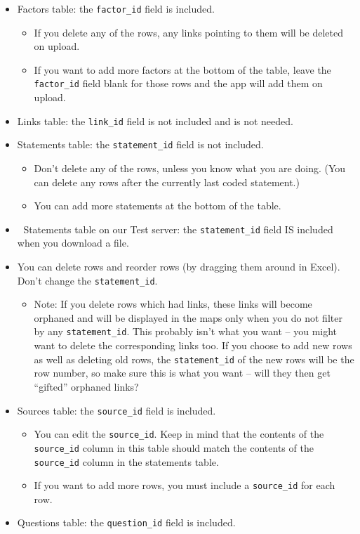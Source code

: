 \documentclass[
]{book}
\providecommand{\tightlist}{%
  \setlength{\itemsep}{0pt}\setlength{\parskip}{0pt}}
\begin{document}
\begin{itemize}
\tightlist
\item
  Factors table: the \texttt{factor\_id} field is included.

  \begin{itemize}
  \tightlist
  \item
    If you delete any of the rows, any links pointing to them will be deleted on upload.
  \item
    If you want to add more factors at the bottom of the table, leave the \texttt{factor\_id} field blank for those rows and the app will add them on upload.
  \end{itemize}
\item
  Links table: the \texttt{link\_id} field is not included and is not needed.
\item
  Statements table: the \texttt{statement\_id} field is not included.

  \begin{itemize}
  \tightlist
  \item
    Don't delete any of the rows, unless you know what you are doing. (You can delete any rows after the currently last coded statement.)
  \item
    You can add more statements at the bottom of the table.
  \end{itemize}
\item
  🧪 Statements table on our Test server: the \texttt{statement\_id} field IS included when you download a file.
\item
  You can delete rows and reorder rows (by dragging them around in Excel). Don't change the \texttt{statement\_id}.

  \begin{itemize}
  \tightlist
  \item
    Note: If you delete rows which had links, these links will become orphaned and will be displayed in the maps only when you do not filter by any \texttt{statement\_id}. This probably isn't what you want -- you might want to delete the corresponding links too. If you choose to add new rows as well as deleting old rows, the \texttt{statement\_id} of the new rows will be the row number, so make sure this is what you want -- will they then get ``gifted'' orphaned links?
  \end{itemize}
\item
  Sources table: the \texttt{source\_id} field is included.

  \begin{itemize}
  \tightlist
  \item
    You can edit the \texttt{source\_id}. Keep in mind that the contents of the \texttt{source\_id} column in this table should match the contents of the \texttt{source\_id} column in the statements table.
  \item
    If you want to add more rows, you must include a \texttt{source\_id} for each row.
  \end{itemize}
\item
  Questions table: the \texttt{question\_id} field is included.


\end{itemize}
\end{document}
